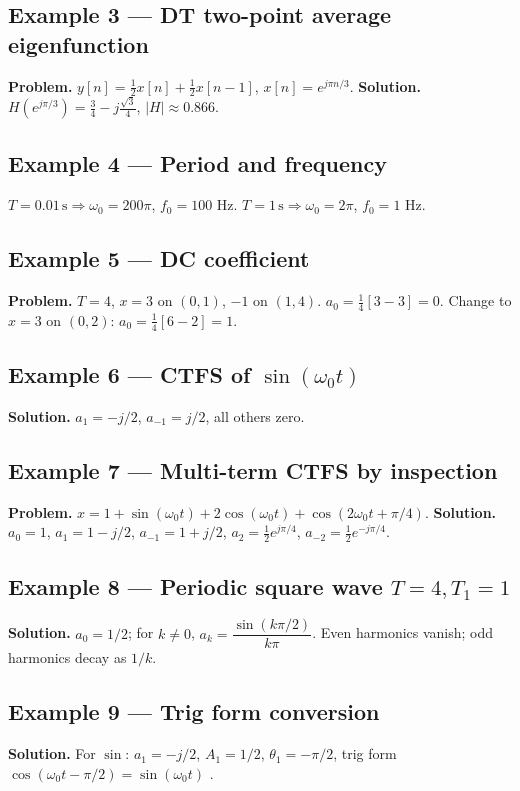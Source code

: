 \documentclass[11pt]{article}
\begin{document}
\subsection{Example 3 --- DT two-point average eigenfunction}
\textbf{Problem.} $y[n]=\tfrac12 x[n]+\tfrac12 x[n-1]$, $x[n]=e^{j\pi n/3}$.
\textbf{Solution.} $H(e^{j\pi/3})=\tfrac34-j\tfrac{\sqrt3}{4}$, $|H|\approx 0.866$.

\subsection{Example 4 --- Period and frequency}
$T=0.01\,\mathrm{s}\Rightarrow\omega_0=200\pi$, $f_0=100$ Hz. $T=1\,\mathrm{s}\Rightarrow\omega_0=2\pi$, $f_0=1$ Hz.

\subsection{Example 5 --- DC coefficient}
\textbf{Problem.} $T=4$, $x=3$ on $(0,1)$, $-1$ on $(1,4)$. $a_0=\tfrac14[3-3]=0$. Change to $x=3$ on $(0,2)$: $a_0=\tfrac14[6-2]=1$.

\subsection{Example 6 --- CTFS of $\sin(\omega_0 t)$}
\textbf{Solution.} $a_1=-j/2$, $a_{-1}=j/2$, all others zero.

\subsection{Example 7 --- Multi-term CTFS by inspection}
\textbf{Problem.} $x=1+\sin(\omega_0 t)+2\cos(\omega_0 t)+\cos(2\omega_0 t+\pi/4)$.
\textbf{Solution.} $a_0=1$, $a_1=1-j/2$, $a_{-1}=1+j/2$, $a_2=\tfrac12 e^{j\pi/4}$, $a_{-2}=\tfrac12 e^{-j\pi/4}$.

\subsection{Example 8 --- Periodic square wave $T=4, T_1=1$}
\textbf{Solution.} $a_0=1/2$; for $k\ne 0$, $a_k=\dfrac{\sin(k\pi/2)}{k\pi}$. Even harmonics vanish; odd harmonics decay as $1/k$.

\subsection{Example 9 --- Trig form conversion}
\textbf{Solution.} For $\sin$: $a_1=-j/2$, $A_1=1/2$, $\theta_1=-\pi/2$, trig form $\cos(\omega_0 t-\pi/2)=\sin(\omega_0 t)$ \checkmark.
\end{document}
